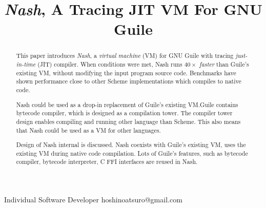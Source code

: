 \documentclass[preprint, numbers]{sigplanconf}
\begin{document}
\setlength{\pdfpageheight}{\paperheight}
\setlength{\pdfpagewidth}{\paperwidth}




\title{\textit{Nash}, A Tracing JIT VM For GNU Guile}

           {Individual Software Developer}
           {hoshinoatsuro@gmail.com}

\maketitle

\begin{abstract}

This paper introduces \textit{Nash}, a \textit{virtual machine} (VM) for GNU
Guile with tracing \textit{just-in-time} (JIT) compiler. When conditions were
met, Nash runs \textit{$40\times$ faster} than Guile's existing VM, without
modifying the input program source code. Benchmarks have shown performance
close to other Scheme implementations which compiles to native code.

Nash could be used as a drop-in replacement of Guile's existing VM.\@ Guile
contains bytecode compiler, which is designed as a compilation tower. The
compiler tower design enables compiling and running other language than
Scheme. This also means that Nash could be used as a VM for other languages.

Design of Nash internal is discussed. Nash coexists with Guile's existing VM,
uses the existing VM during native code compilation. Lots of Guile's features,
such as bytecode compiler, bytecode interpreter, C FFI interfaces are reused
in Nash.

\end{abstract}
\end{document}
